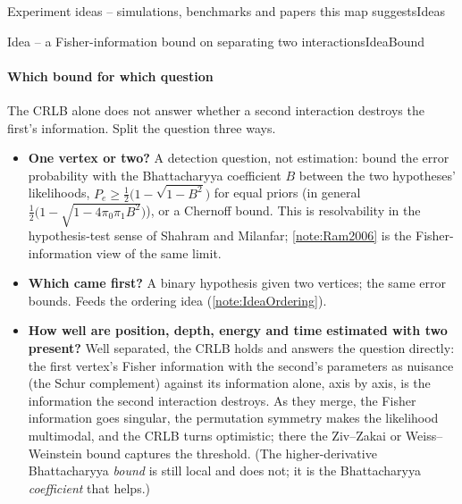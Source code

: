 \begin{programnote}{Experiment ideas -- simulations, benchmarks and papers this map suggests}{Ideas}
\begin{papernote}{Idea -- a Fisher-information bound on separating two interactions}{IdeaBound}
\paragraph{Which bound for which question}
The CRLB alone does not answer whether a second interaction destroys the
first's information. Split the question three ways.
\begin{itemize}
	\item \textbf{One vertex or two?} A detection question, not estimation:
		bound the error probability with the Bhattacharyya coefficient $B$
		between the two hypotheses' likelihoods,
		$P_e \ge \tfrac12\bigl(1-\sqrt{1-B^2}\bigr)$ for equal priors (in
		general $\tfrac12\bigl(1-\sqrt{1-4\pi_0\pi_1B^2}\bigr)$), or a
		Chernoff bound. This is resolvability in the hypothesis-test sense of
		Shahram and Milanfar; \ref{note:Ram2006} is the Fisher-information
		view of the same limit.
	\item \textbf{Which came first?} A binary hypothesis given two vertices;
		the same error bounds. Feeds the ordering idea
		(\ref{note:IdeaOrdering}).
	\item \textbf{How well are position, depth, energy and time estimated with
		two present?} Well separated, the CRLB holds and answers the question
		directly: the first vertex's Fisher information with the second's
		parameters as nuisance (the Schur complement) against its information
		alone, axis by axis, is the information the second interaction
		destroys. As they merge, the Fisher information goes singular, the
		permutation symmetry makes the likelihood multimodal, and the CRLB
		turns optimistic; there the Ziv--Zakai or Weiss--Weinstein bound
		captures the threshold. (The higher-derivative Bhattacharyya
		\emph{bound} is still local and does not; it is the Bhattacharyya
		\emph{coefficient} that helps.)
\end{itemize}


\end{papernote}
\end{programnote}
